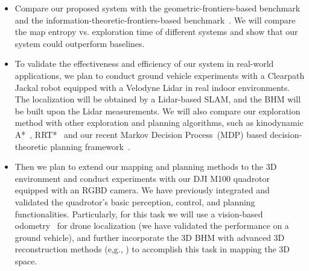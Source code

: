 \begin{itemize}
    \item
    Compare our proposed system with the geometric-frontiers-based benchmark~\cite{cieslewski2017rapid} and the information-theoretic-frontiers-based benchmark~\cite{francis_functional_2020,bai_information-theoretic_2016}. We will compare the map entropy vs. exploration time of different systems and show that our system could outperform baselines. %
    \item
    To validate the effectiveness and efficiency of our system in real-world applications, we plan to conduct ground vehicle  experiments with a Clearpath Jackal robot equipped with a Velodyne Lidar in real indoor environments. The localization will be obtained by a Lidar-based SLAM, and the BHM will be built upon the Lidar measurements. We will also compare our exploration method with other exploration and planning algorithms, such as kinodynamic A*~\cite{zhou2019robust}, RRT*~\cite{karaman2011sampling} and our recent Markov Decision Process~(MDP) based decision-theoretic planning framework~\cite{xu2020kernel}.
    \item
    Then we plan to extend our mapping and planning methods to the 3D environment and conduct experiments with our DJI M100 quadrotor equipped with an RGBD camera. We have previously integrated and validated the quadrotor's basic perception, control, and planning functionalities. Particularly, for this task we will use a vision-based odometry~\cite{qin2018vins} for drone localization (we have validated the performance on a ground vehicle), and further incorporate the 3D BHM with advanced 3D reconstruction methods (e,g., \cite{wang2019real}) to accomplish this task in mapping the 3D space. 
\end{itemize}




